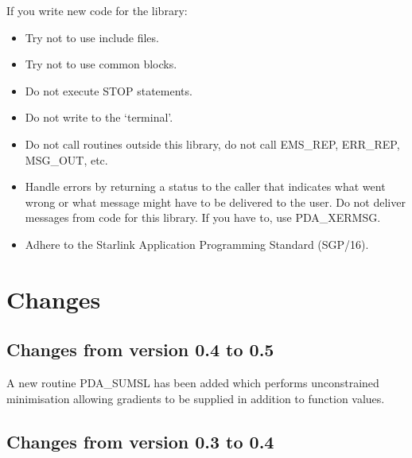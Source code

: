 \documentclass[11pt,twoside]{article}
\newcommand{\htmlref}[2]{#1}
\newcommand{\xref}[3]{#1}
\newcommand{\xlabel}[1]{}
\begin{document}
   If you write new code for the library:
\begin{itemize}
\item Try not to use include files.
\item Try not to use common blocks.
\item Do not execute STOP statements.
\item Do not write to the `terminal'.
\item Do not call routines outside this library, do not call EMS\_REP,
   ERR\_REP, MSG\_OUT, etc.
\item Handle errors by returning a status to the caller that indicates
   what went wrong or what message might have to be delivered to the
   user. Do not deliver messages from code for this library. If you have
   to, use
\htmlref{PDA\_XERMSG.}{PDA\_XERMSG}
\item Adhere to the
\xref{Starlink Application Programming Standard (SGP/16).}{sgp16}{}
\end{itemize}

\section{\xlabel{changes}Changes}

\subsection{\xlabel{changes_from_version_0.4_to_0.5}Changes from version 0.4 to 0.5}
A new routine PDA\_SUMSL has been added which performs unconstrained
minimisation allowing gradients to be supplied in addition to function
values.

\subsection{\xlabel{changes_from_version_0.3_to_0.4}Changes from version 0.3 to 0.4}
\end{document}
